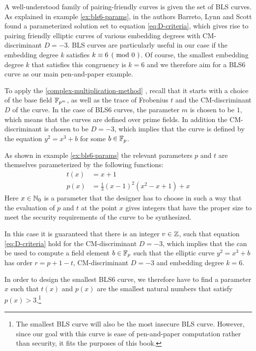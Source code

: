 A well-understood family of pairing-friendly curves is given the set of BLS curves. As explained in example \ref{ex:bls6-params}, in \cite{bls-02} the authors Barreto, Lynn and Scott found a parameterized solution set to equation \ref{eq:D-criteria}, which gives rise to pairing friendly elliptic curves of various embedding degrees with CM-discriminant $D = -3$. BLS curves are particularly useful in our case if the embedding degree $k$ satisfies $\kongru{k}{6}{0}$. Of course, the smallest embedding degree $k$ that satisfies this congruency is $k=6$ and we therefore aim for a BLS6 curve as our main pen-and-paper example. 


To apply the  \ref{complex-multiplication-method} , recall that it starts with a choice of the base field $\mathbb{F}_{p^m}$, as well as the trace of Frobenius $t$ and the CM-discriminant $D$ of the curve. In the case of BLS6 curves, the parameter $m$ is chosen to be $1$, which means that the curves are defined over prime fields. In addition the CM-discriminant is chosen to be $D=-3$, which implies that the curve is defined by the equation $y^2 = x^3 +b$ for some $b\in \mathbb{F}_p$. 

As shown in example \ref{ex:bls6-params} the relevant parameters $p$ and $t$ are themselves parameterized by the following functions:
\begin{equation}
\begin{split}
t(x) &= x+1\\
p(x) &= \frac{1}{3}(x-1)^2(x^{2}-x+1) +x
\end{split}
\end{equation}
Here $x\in\mathbb{N}_0$ is a parameter that the designer has to choose in such a way that the evaluation of $p$ and $t$ at the point $x$ gives integers that have the proper size to meet the security requirements of the curve to be synthesized. 

In this case it is guaranteed that there is an integer $v\in\mathbb{Z}$, such that equation \ref{eq:D-criteria} hold for the CM-discriminant $D=-3$, which implies that the  can be used to compute a field element $b\in\mathbb{F}_p$ such that the elliptic curve $y^2 = x^3 +b$ has order $r=p+1-t$, CM-discriminant $D=-3$ and embedding degree $k=6$. 

In order to design the smallest BLS6 curve, we therefore have to find a parameter $x$ such that $t(x)$ and $p(x)$ are the smallest natural numbers that satisfy $p(x)>3$.\footnote{The smallest BLS curve will also be the most insecure BLS curve. However, since our goal with this curve is ease of pen-and-paper computation rather than security, it fits the purposes of this book.}

